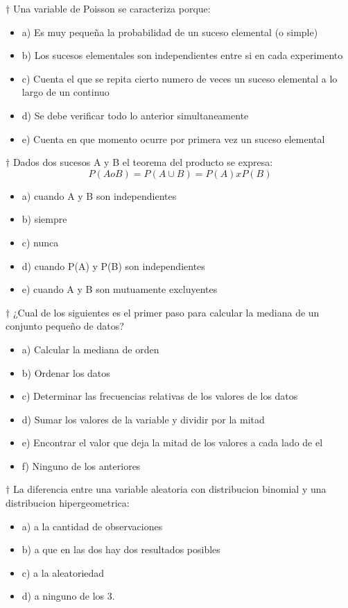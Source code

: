 \documentclass[10pt,a4paper]{article}
\begin{document}
$\dagger$ Una variable de Poisson se caracteriza porque:
\begin{itemize}
	\item a) Es muy pequeña la probabilidad de un suceso elemental (o simple)
	\item b) Los sucesos elementales son independientes entre si en cada experimento
	\item c) Cuenta el que se repita cierto numero de veces un suceso elemental a lo largo de un continuo
	\item d) Se debe verificar todo lo anterior simultaneamente
	\item e) Cuenta en que momento ocurre por primera vez un suceso elemental
\end{itemize}

$\dagger$ Dados dos sucesos A y B el teorema del producto se expresa:
\begin{equation}
	P(A o B) = P(A \cup B) = P(A)xP(B)
\end{equation}
\begin{itemize}
	\item a) cuando A y B son independientes
	\item b) siempre
	\item c) nunca
	\item d) cuando P(A) y P(B) son independientes
	\item e) cuando A y B son mutuamente excluyentes
\end{itemize}

$\dagger$ ¿Cual de los siguientes es el primer paso para calcular la mediana de un conjunto pequeño de datos?
\begin{itemize}
	\item a) Calcular la mediana de orden
	\item b) Ordenar los datos
	\item c) Determinar las frecuencias relativas de los valores de los datos
	\item d) Sumar los valores de la variable y dividir por la mitad
	\item e) Encontrar el valor que deja la mitad de los valores a cada lado de el
	\item f) Ninguno de los anteriores
\end{itemize}

$\dagger$ La diferencia entre una variable aleatoria con distribucion binomial y una distribucion hipergeometrica:
\begin{itemize}
	\item a) a la cantidad de observaciones
	\item b) a que en las dos hay dos resultados posibles
	\item c) a la aleatoriedad
	\item d) a ninguno de los 3.
\end{itemize}
\end{document}
